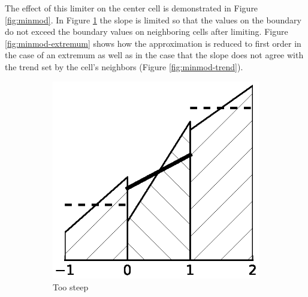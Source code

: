 The effect of this limiter on the center cell is demonstrated in Figure \ref{fig:minmod}.
In Figure \ref{fig:minmod-steep} the slope is limited so that the values on the boundary do not exceed the boundary values on neighboring cells after limiting.
Figure \ref{fig:minmod-extremum} shows how the approximation is reduced to first order in the case of an extremum as well as in the case that the slope does not agree with the trend set by the cell's neighbors (Figure \ref{fig:minmod-trend}).
\begin{figure}
  \centering
  \begin{subfigure}{0.27\textwidth}
    \centering
    \includegraphics[width=\textwidth]{figures/minmod-a}
    \caption{Too steep}
    \label{fig:minmod-steep}
  \end{subfigure}
  \hfill
  \begin{subfigure}{0.27\textwidth}
    \centering

\end{subfigure}
\end{figure}
